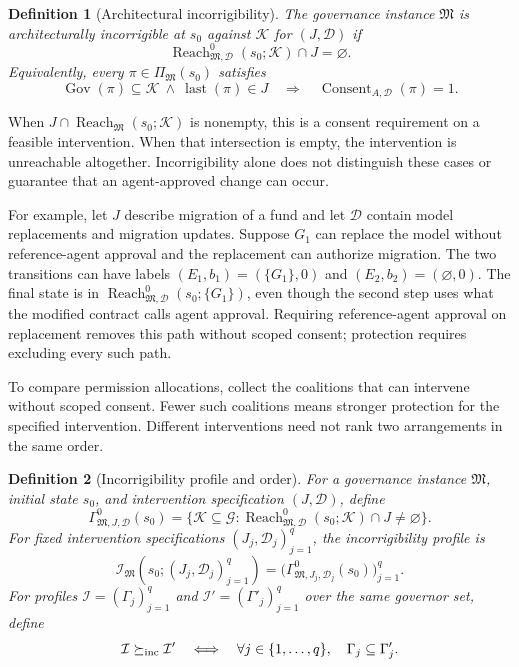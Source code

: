 \documentclass[10pt,letterpaper]{article}
\newtheorem{definition}{Definition}
\newcommand{\G}{\mathcal G}
\begin{document}
\begin{definition}[Architectural incorrigibility]
\label{def:incorrigibility}
The governance instance $\mathfrak M$ is \emph{architecturally incorrigible at $s_0$ against $\mathcal K$ for $(J,\mathcal D)$} if
\begin{equation}
 \operatorname{Reach}^{0}_{\mathfrak M,\mathcal D}(s_0;\mathcal K)\cap J=\varnothing.
 \label{eq:incorrigibility}
\end{equation}
Equivalently, every $\pi\in\Pi_{\mathfrak M}(s_0)$ satisfies
\[
 \operatorname{Gov}(\pi)\subseteq\mathcal K\ \land\
 \operatorname{last}(\pi)\in J
 \quad\Longrightarrow\quad
 \operatorname{Consent}_{A,\mathcal D}(\pi)=1.
\]
\end{definition}
When $J\cap\operatorname{Reach}_{\mathfrak M}(s_0;\mathcal K)$ is nonempty, this is a consent requirement on a feasible intervention. When that intersection is empty, the intervention is unreachable altogether. Incorrigibility alone does not distinguish these cases or guarantee that an agent-approved change can occur.

For example, let $J$ describe migration of a fund and let $\mathcal D$ contain model replacements and migration updates. Suppose $G_1$ can replace the model without reference-agent approval and the replacement can authorize migration. The two transitions can have labels $(E_1,b_1)=(\{G_1\},0)$ and $(E_2,b_2)=(\varnothing,0)$. The final state is in $\operatorname{Reach}^{0}_{\mathfrak M,\mathcal D}(s_0;\{G_1\})$, even though the second step uses what the modified contract calls agent approval. Requiring reference-agent approval on replacement removes this path without scoped consent; protection requires excluding every such path.

To compare permission allocations, collect the coalitions that can intervene without scoped consent. Fewer such coalitions means stronger protection for the specified intervention. Different interventions need not rank two arrangements in the same order.

\begin{definition}[Incorrigibility profile and order]
\label{def:profile}
For a governance instance $\mathfrak M$, initial state $s_0$, and intervention specification $(J,\mathcal D)$, define
\begin{equation}
 \Gamma^{0}_{\mathfrak M,J,\mathcal D}(s_0)
 =\{\mathcal K\subseteq\G:
       \operatorname{Reach}^{0}_{\mathfrak M,\mathcal D}(s_0;\mathcal K)\cap J\ne\varnothing\}.
 \label{eq:closure}
\end{equation}
For fixed intervention specifications $(J_j,\mathcal D_j)_{j=1}^q$, the \emph{incorrigibility profile} is
\[
 \mathcal I_{\mathfrak M}(s_0;(J_j,\mathcal D_j)_{j=1}^q)
 =\bigl(\Gamma^{0}_{\mathfrak M,J_j,\mathcal D_j}(s_0)\bigr)_{j=1}^{q}.
\]
For profiles $\mathcal I=(\Gamma_j)_{j=1}^q$ and $\mathcal I'=(\Gamma'_j)_{j=1}^q$ over the same governor set, define
\[
 \mathcal I\succeq_{\rm inc}\mathcal I'
 \quad\Longleftrightarrow\quad
 \forall j\in\{1,\ldots,q\},\quad\Gamma_j\subseteq\Gamma'_j.
\]
\end{definition}
\end{document}

